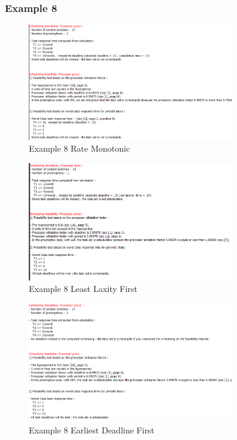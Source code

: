 \documentclass{article}
\begin{document}
\subsubsection*{Example 8}
\begin{figure}[H]
    \centering
    \includegraphics[width=0.8\textwidth]{8_RM.png}
    \caption{Example 8 Rate Monotonic}
\end{figure}
\begin{figure}[H]
    \centering
    \includegraphics[width=0.8\textwidth]{8_LLF.png}
    \caption{Example 8 Least Laxity First}
\end{figure}
\begin{figure}[H]
    \centering
    \includegraphics[width=0.8\textwidth]{8_EDF.png}
    \caption{Example 8 Earliest Deadline First}
\end{figure}
\end{document}
